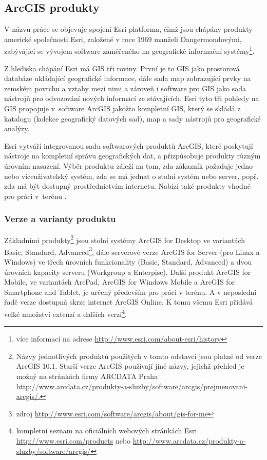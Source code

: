 \subsection{ArcGIS produkty}

V názvu práce se objevuje spojení Esri platforma, čímž jsou chápány produkty
ame\-ric\-ké společnosti Esri, založené v roce 1969 manželi Dangermondovými,
zabývájící se vývojem software zaměřeného na geografické informační
systémy\footnote{více informací na adrese
\url{http://www.esri.com/about-esri/history}}.

Z hlediska chápání Esri má GIS tři roviny. První je to GIS jako prostorová
databáze ukládající geografické informace, dále sada map zobrazující prvky na
zemském povrchu a vztahy mezi nimi a zároveň i software pro GIS jako sada
nástrojů pro odvozování nových informací ze stávajících. Esri tyto tři pohledy
na GIS propojuje v~software ArcGIS jakožto kompletní GIS, který se skládá z
katalogu (kolekce geografický datových sad), map a sady nástrojů pro
geografické analýzy.

Esri vytváří integrovanou sadu softwarových produktů ArcGIS, které poskytují
nástroje na kompletní správu geografických dat, a přizpůsobuje produkty různým
úrovním nasazení. Výběr produktu záleží na tom, zda zákazník požaduje jedno-
nebo víceuživatelský systém, zda se má jednat o stolní systém nebo server,
popř. zda má být dostupný prostřednictvím internetu. Nabízí také produkty
vhodné pro práci v~terénu \citep{Esri2006}.

\subsubsection{Verze a varianty produktu}

Základními produkty\footnote{Názvy jednotlivých produktů použitých v tomto
odstavci jsou platné od verze ArcGIS 10.1. Starší verze ArcGIS používají jiné
názvy, jejichž přehled je možný na stránkách firmy ARCDATA Praha
\url{http://www.arcdata.cz/produkty-a-sluzby/software/arcgis/prejmenovani-arcgis/.}}
jsou stolní systémy ArcGIS for Desktop ve variantách Basic, Standard,
Advanced\footnote{zdroj
\url{http://www.esri.com/software/arcgis/about/gis-for-me}}, dále serverové
verze ArcGIS for Server (pro Linux a Windows) ve třech úrovních funkcionality
(Basic, Standard, Advanced) a dvou úrovních kapacity serveru (Workgroup a
Enterpise). Další produkt ArcGIS for Mobile, ve variantách ArcPad, ArcGIS for
Windows Mobile a ArcGIS for Smartphone and Tablet, je určený především pro
práci v terénu. A v neposlední řadě verze dostupná skrze internet ArcGIS
Online. K tomu všemu Esri přidává velké množství extenzí a dalších
verzí\footnote{kompletní seznam na oficiálních webových stránkách Esri
\url{http://www.esri.com/products} nebo
\url{http://www.arcdata.cz/produkty-a-sluzby/software/arcgis/}}.


